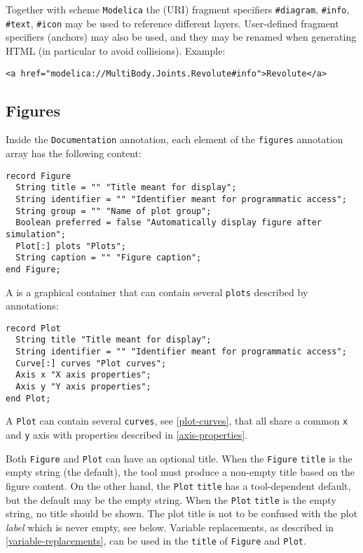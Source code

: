 Together with scheme \lstinline!Modelica! the (URI) fragment specifiers
\lstinline!#diagram!, \lstinline!#info!, \lstinline!#text!, \lstinline!#icon! may be used to reference different
layers. User-defined fragment specifiers (anchors) may also be used, and they may be renamed
when generating HTML (in particular to avoid collisions).
Example:
\begin{lstlisting}[language=modelica]
<a href="modelica://MultiBody.Joints.Revolute#info">Revolute</a>
\end{lstlisting}

\subsection{Figures}\label{annotations-for-figures}\label{figures}

Inside the \lstinline!Documentation! annotation, each element of the \lstinline!figures! annotation array has the following content:
\begin{lstlisting}[language=modelica]
record Figure
  String title = "" "Title meant for display";
  String identifier = "" "Identifier meant for programmatic access";
  String group = "" "Name of plot group";
  Boolean preferred = false "Automatically display figure after simulation";
  Plot[:] plots "Plots";
  String caption = "" "Figure caption";
end Figure;
\end{lstlisting}

A  is a graphical container that can contain several \lstinline!plots! described by  annotations:
\begin{lstlisting}[language=modelica]
record Plot
  String title "Title meant for display";
  String identifier = "" "Identifier meant for programmatic access";
  Curve[:] curves "Plot curves";
  Axis x "X axis properties";
  Axis y "Y axis properties";
end Plot;
\end{lstlisting}

A \lstinline!Plot! can contain several \lstinline!curves!, see \cref{plot-curves}, that all share a common \lstinline!x! and \lstinline!y! axis with properties described in \cref{axis-properties}.

Both \lstinline!Figure! and \lstinline!Plot! can have an optional title. When
the \lstinline!Figure! \lstinline!title! is the empty string (the default), the
tool must produce a non-empty title based on the figure content.  On the other
hand, the \lstinline!Plot! \lstinline!title! has a tool-dependent default, but
the default may be the empty string.  When the \lstinline!Plot! \lstinline!title! is the empty string, no
title should be shown. The plot title is not to be confused with the plot
\emph{label} which is never empty, see below. Variable replacements, as
described in \cref{variable-replacements}, can be used in the
\lstinline!title! of \lstinline!Figure! and \lstinline!Plot!.

